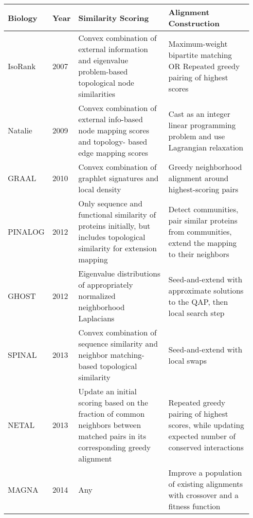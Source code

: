 \documentclass[12pt]{thesis}
\theoremstyle{plain}
\theoremstyle{definition}
\theoremstyle{remark}
\begin{document}
\begin{table}[!hp]
\centering
{\fontsize{11}{13}\selectfont
\begin{tabular}{|L{0.2\textwidth}|L{0.055\textwidth}|L{0.33\textwidth}|L{0.31\textwidth}|}
\hline
\textbf{Biology} & \textbf{Year} & \textbf{Similarity Scoring} & \textbf{Alignment Construction} \\ \hline\hline
IsoRank \cite{Singh_2007} & 2007 & Convex combination of external information and eigenvalue problem-based topological node similarities  & Maximum-weight bipartite matching OR Repeated greedy pairing of highest scores \\ \hline

Natalie \cite{Klau_2009} & 2009 & Convex combination of external info-based node mapping scores and topology- based edge mapping scores & Cast as an integer linear programming problem and use Lagrangian relaxation \\ \hline

GRAAL \cite{Kuchaiev_2010} & 2010 & Convex combination of graphlet signatures and local density & Greedy neighborhood alignment around highest-scoring pairs \\ \hline

PINALOG \cite{phan2012pinalog} & 2012 & Only sequence and functional similarity of proteins initially, but includes topological similarity for extension mapping & Detect communities, pair similar proteins from communities, extend the mapping to their neighbors  \\ \hline

GHOST \cite{Patro_2012} & 2012 & Eigenvalue distributions of appropriately normalized neighborhood Laplacians & Seed-and-extend with approximate solutions to the QAP, then local search step \\ \hline

SPINAL \cite{aladaug2013spinal} & 2013 & Convex combination of sequence similarity and neighbor matching-based topological similarity  & Seed-and-extend with local swaps \\ \hline

NETAL \cite{Neyshabur_2013} & 2013 & Update an initial scoring based on the fraction of common neighbors between matched pairs in its corresponding greedy alignment & Repeated greedy pairing of highest scores, while updating expected number of conserved interactions \\ \hline

MAGNA \cite{Saraph_2014} & 2014 & Any & Improve a population of existing alignments with crossover and a fitness function \\ \hline


\end{tabular}}
\end{table}
\end{document}
